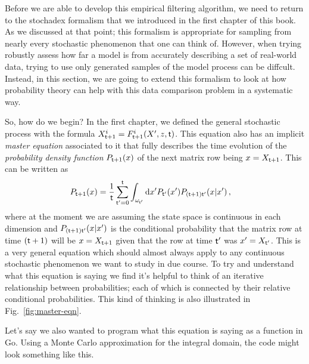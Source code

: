 Before we are able to develop this empirical filtering algorithm, we need to return to the stochadex formalism that we introduced in the first chapter of this book. As we discussed at that point; this formalism is appropriate for sampling from nearly every stochastic phenomenon that one can think of. However, when trying robustly assess how far a model is from accurately describing a set of real-world data, trying to use only generated samples of the model process can be diffcult. Instead, in this section, we are going to extend this formalism to look at how probability theory can help with this data comparison problem in a systematic way.

So, how do we begin? In the first chapter, we defined the general stochastic process with the formula $X^{i}_{{\sf t}+1} = F^{i}_{{\sf t}+1}(X',z,{\sf t})$. This equation also has an implicit \emph{master equation} associated to it that fully describes the time evolution of the \emph{probability density function} $P_{{\sf t}+1}(x)$ of the next matrix row being $x=X_{{\sf t}+1}$. This can be written as
\begin{align}
P_{{\sf t}+1}(x) &= \frac{1}{{\sf t}}\sum_{{\sf t}'=0}^{{\sf t}}\int_{\omega_{{\sf t}'}}{\rm d}x' P_{{\sf t}'}(x') P_{({\sf t}+1){\sf t}'}(x\vert x') \label{eq:master-x-cont} \,,
\end{align}
where at the moment we are assuming the state space is continuous in each dimension and $P_{({\sf t}+1){\sf t}'}(x\vert x')$ is the conditional probability that the matrix row at time $({\sf t}+1)$ will be $x=X_{{\sf t}+1}$ given that the row at time ${\sf t}'$ was $x'=X_{{\sf t}'}$. This is a very general equation which should almost always apply to any continuous stochastic phenomenon we want to study in due course. To try and understand what this equation is saying we find it's helpful to think of an iterative relationship between probabilities; each of which is connected by their relative conditional probabilities. This kind of thinking is also illustrated in Fig.~\ref{fig:master-eqn}. 

Let's say we also wanted to program what this equation is saying as a function in Go. Using a Monte Carlo approximation for the integral domain, the code might look something like this.

